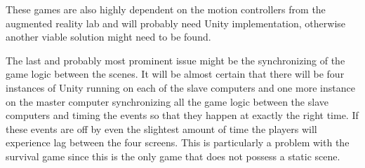 \documentclass[10pt,a4paper]{article}
\begin{document}
These games are also highly dependent on the motion controllers from the augmented reality lab and will probably need Unity implementation, otherwise another viable solution might need to be found. 

The last and probably most prominent issue might be the synchronizing of the game logic between the scenes. It will be almost certain that there will be four instances of Unity running on each of the slave computers and one more instance on the master computer synchronizing all the game logic between the slave computers and timing the events so that they happen at exactly the right time. If these events are off by even the slightest amount of time the players will experience lag between the four screens. This is particularly a problem with the survival game since this is the only game that does not possess a static scene.
\end{document}
